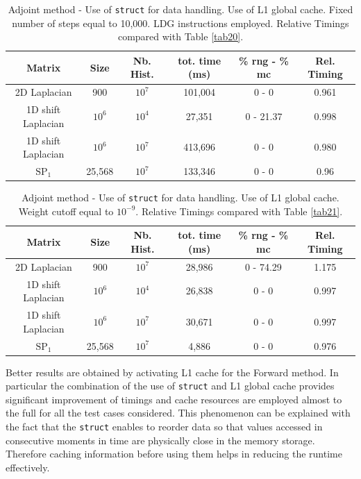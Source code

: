 \documentclass[a4paper,10pt]{article}
\begin{document}
\begin{table}[!h]
\begin{tabular}{|c|c|c|c|c|c|}
\hline
\textbf{Matrix} & \textbf{Size} &\textbf{Nb. Hist.} & tot. time (ms)& \% rng - 
\% mc & Rel. Timing\\
\hline
2D Laplacian& 900 & $10^7$ & 101,004 & 0 - 0 & 0.961 \\
\hline 
1D shift Laplacian& $10^6$ & $10^4$ &  27,351 & 0 - 21.37 & 0.998\\
\hline
1D shift Laplacian& $10^6$ & $10^7$ & 413,696 & 0 - 0 & 0.980\\
\hline
$\text{SP}_1$ & 25,568 & $10^7$ & 133,346 & 0 - 0 & 0.96\\
\hline
\end{tabular}
\caption{Adjoint method - Use of \texttt{struct} for data handling. Use of L1 
global cache. Fixed number of steps equal 
to 10,000. LDG instructions employed. Relative Timings compared with Table 
\ref{tab20}.} 
\label{tab36}
\end{table}


\begin{table}[!h]
\begin{tabular}{|c|c|c|c|c|c|}
\hline
\textbf{Matrix} & \textbf{Size} &\textbf{Nb. Hist.} & tot. time (ms)& \% rng - 
\% mc & Rel. Timing\\
\hline
2D Laplacian& 900 & $10^7$ & 28,986 & 0 - 74.29 & 1.175 \\
\hline 
1D shift Laplacian& $10^6$ & $10^4$ &  26,838 & 0 - 0 & 0.997\\
\hline
1D shift Laplacian& $10^6$ & $10^7$ & 30,671 & 0 - 0 & 0.997\\
\hline
$\text{SP}_1$ & 25,568 & $10^7$ & 4,886 & 0 - 0 & 0.976\\
\hline
\end{tabular}
\caption{Adjoint method - Use of \texttt{struct} for data handling. Use 
of L1 global cache. Weight 
cutoff equal to $10^{-9}$. Relative Timings compared with Table 
\ref{tab21}.} 
\label{tab37}
\end{table}


Better results are obtained by activating L1 cache for the Forward method. In 
particular the combination of the use of \texttt{struct} and L1 global cache 
provides significant improvement of timings and cache resources are employed 
almost to the full for all the test cases considered. This phenomenon can be 
explained with the fact that the \texttt{struct} enables to reorder data so 
that values accessed in consecutive moments in time are physically close in the 
memory storage. Therefore caching information before using them helps in 
reducing the runtime effectively. 
\end{document}
